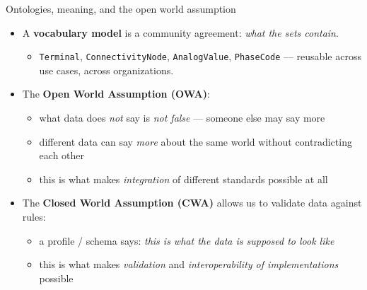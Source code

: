 \begin{frame}{Ontologies, meaning, and the open world assumption}

  \begin{itemize}
    \item A \textbf{vocabulary model} is a community agreement: \emph{what the sets contain}.
    \begin{itemize}
      \item \texttt{Terminal}, \texttt{ConnectivityNode}, \texttt{AnalogValue}, \texttt{PhaseCode} — reusable across use cases, across organizations.
    \end{itemize}
    \pause
    \item The \textbf{Open World Assumption (OWA)}:
    \begin{itemize}
      \item what data does \emph{not} say is \emph{not false} — someone else may say more
      \item different data can say \emph{more} about the same world without contradicting each other
      \item this is what makes \emph{integration} of different standards possible at all
    \end{itemize}
    \pause
    \item The \textbf{Closed World Assumption (CWA)} allows us to validate data against rules:
    \begin{itemize}
      \item a profile / schema says: \emph{this is what the data is supposed to look like}
      \item this is what makes \emph{validation} and \emph{interoperability of implementations} possible
    \end{itemize}
  \end{itemize}

\end{frame}
